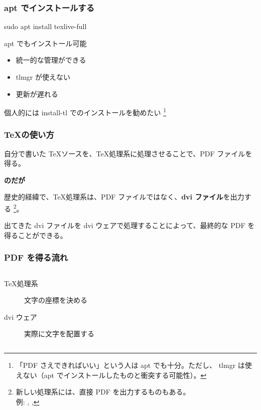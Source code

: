 \documentclass[aspectratio=149,10pt,t,]{beamer}
\newcommand{\nishikifont}{\nishikifonta\nishikifontj}
\newcommand{\centeralign}[1]{\rule{0pt}{0pt}\hfill#1\hfill\rule{0pt}{0pt}}
\newcommand{\hmemph}[1]{\textbf{#1}}
\begin{document}
\begin{frame}
	\frametitle{apt でインストールする}
	\begin{typecmdbox}
		sudo apt install texlive-full
	\end{typecmdbox}
	
	apt でもインストール可能
	
	\begin{itemize}
		\item 統一的な管理ができる
		\item tlmgr が使えない
		\item 更新が遅れる
	\end{itemize}
	
	個人的には install-tl でのインストールを勧めたい
	\footnote{「PDF さえできればいい」という人は apt でも十分。ただし、
	tlmgr は使えない（apt でインストールしたものと衝突する可能性）。}
\end{frame}

\frame[c]{\section{\TeX の使い方} {\nishikifont 😀 美文書 2 章 😀}}

\begin{frame}
	\frametitle{\TeX の使い方}
	自分で書いた \TeX ソースを、\TeX 処理系に処理させることで、PDF ファイルを得る。\par
	\centeralign{\hmemph{のだが}}\par
	歴史的経緯で、\TeX 処理系は、PDF ファイルではなく、\hmemph{dvi ファイル}を出力する
	\footnote{新しい処理系には、直接 PDF を出力するものもある。\\例: \pdfTeX, \LuaTeX, \XeTeX}。
	
	出てきた dvi ファイルを dvi ウェアで処理することによって、最終的な PDF を得ることができる。
\end{frame}

\begin{frame}
	\frametitle{PDF を得る流れ}
	\begin{columns}[c]
		\begin{column}{0.6\textwidth}
			\begin{description}
				\item[\TeX 処理系] 文字の座標を決める
				\item[dvi ウェア] 実際に文字を配置する
			\end{description}
		\end{column}
		\begin{column}{0.4\textwidth}
			\centering
		\end{column}
	\end{columns}
\end{frame}
\end{document}
